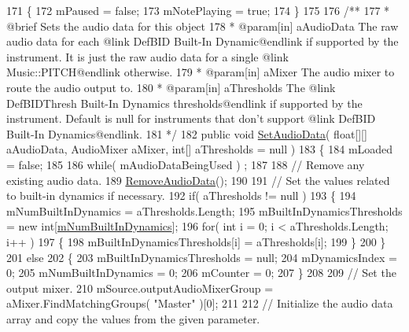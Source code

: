 \begin{DoxyCodeInclude}
171     \{
172         mPaused = \textcolor{keyword}{false};
173         mNotePlaying = \textcolor{keyword}{true};
174     \}
175 \textcolor{comment}{}
176 \textcolor{comment}{    /**}
177 \textcolor{comment}{     * @brief Sets the audio data for this object}
178 \textcolor{comment}{     * @param[in] aAudioData The raw audio data for each @link DefBID Built-In Dynamic@endlink if supported
       by the instrument. It is just the raw audio data for a single @link Music::PITCH@endlink otherwise.}
179 \textcolor{comment}{     * @param[in] aMixer The audio mixer to route the audio output to.}
180 \textcolor{comment}{     * @param[in] aThresholds The @link DefBIDThresh Built-In Dynamics thresholds@endlink if supported by
       the instrument. Default is null for instruments that don't support @link DefBID Built-In Dynamics@endlink.}
181 \textcolor{comment}{    */}
182     \textcolor{keyword}{public} \textcolor{keywordtype}{void} \hyperlink{group___n_o_o_pub_func_gaef9ab691f0a2671a62249d853f24162d}{SetAudioData}( \textcolor{keywordtype}{float}[][] aAudioData, AudioMixer aMixer, \textcolor{keywordtype}{int}[] aThresholds = null
       )
183     \{
184         mLoaded = \textcolor{keyword}{false};
185 
186         \textcolor{keywordflow}{while}( mAudioDataBeingUsed ) ;
187 
188         \textcolor{comment}{// Remove any existing audio data.}
189         \hyperlink{group___n_o_o_priv_func_ga12f593bb5de83dc548eff4617fc687b5}{RemoveAudioData}();
190 
191         \textcolor{comment}{// Set the values related to built-in dynamics if necessary. }
192         \textcolor{keywordflow}{if}( aThresholds != null )
193         \{
194             mNumBuiltInDynamics = aThresholds.Length;
195             mBuiltInDynamicsThresholds = \textcolor{keyword}{new} \textcolor{keywordtype}{int}[\hyperlink{group___n_o_o_priv_var_ga3cc04564fcc1b1c4597af18e7e4fbc47}{mNumBuiltInDynamics}];
196             \textcolor{keywordflow}{for}( \textcolor{keywordtype}{int} i = 0; i < aThresholds.Length; i++ )
197             \{
198                 mBuiltInDynamicsThresholds[i] = aThresholds[i];
199             \}
200         \}
201         \textcolor{keywordflow}{else}
202         \{
203             mBuiltInDynamicsThresholds = null;
204             mDynamicsIndex = 0;
205             mNumBuiltInDynamics = 0;
206             mCounter = 0;
207         \}
208 
209         \textcolor{comment}{// Set the output mixer.}
210         mSource.outputAudioMixerGroup = aMixer.FindMatchingGroups( \textcolor{stringliteral}{"Master"} )[0];
211 
212         \textcolor{comment}{// Initialize the audio data array and copy the values from the given parameter.}

\end{DoxyCodeInclude}
